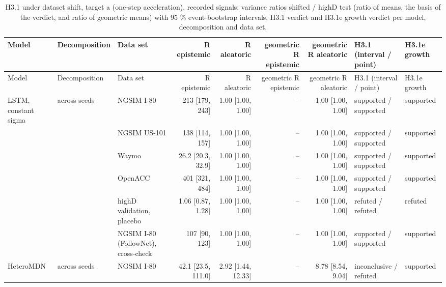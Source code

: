\begingroup
\footnotesize
\begin{longtable}{lllrrrrll}
\caption{H3.1 under dataset shift, target a (one-step acceleration), recorded signals: variance ratios shifted / highD test (ratio of means, the basis of the verdict, and ratio of geometric means) with 95 \% event-bootstrap intervals, H3.1 verdict and H3.1e growth verdict per model, decomposition and data set.}\label{tab:t2-h31--raw--a} \\
\toprule
Model & Decomposition & Data set & R epistemic & R aleatoric & geometric R epistemic & geometric R aleatoric & H3.1 (interval / point) & H3.1e growth \\
\midrule
\endfirsthead
\toprule
Model & Decomposition & Data set & R epistemic & R aleatoric & geometric R epistemic & geometric R aleatoric & H3.1 (interval / point) & H3.1e growth \\
\midrule
\endhead
\bottomrule
\endlastfoot
LSTM, constant sigma & across seeds & NGSIM I-80 & 213 [179, 243] & 1.00 [1.00, 1.00] & -- & 1.00 [1.00, 1.00] & supported / supported & supported \\
 &  & NGSIM US-101 & 138 [114, 157] & 1.00 [1.00, 1.00] & -- & 1.00 [1.00, 1.00] & supported / supported & supported \\
 &  & Waymo & 26.2 [20.3, 32.9] & 1.00 [1.00, 1.00] & -- & 1.00 [1.00, 1.00] & supported / supported & supported \\
 &  & OpenACC & 401 [321, 484] & 1.00 [1.00, 1.00] & -- & 1.00 [1.00, 1.00] & supported / supported & supported \\
 &  & highD validation, placebo & 1.06 [0.87, 1.28] & 1.00 [1.00, 1.00] & -- & 1.00 [1.00, 1.00] & refuted / refuted & refuted \\
 &  & NGSIM I-80 (FollowNet), cross-check & 107 [90, 123] & 1.00 [1.00, 1.00] & -- & 1.00 [1.00, 1.00] & supported / supported & supported \\
\midrule
HeteroMDN & across seeds & NGSIM I-80 & 42.1 [23.5, 111.0] & 2.92 [1.44, 12.33] & -- & 8.78 [8.54, 9.04] & inconclusive / refuted & supported \\

\end{longtable}
